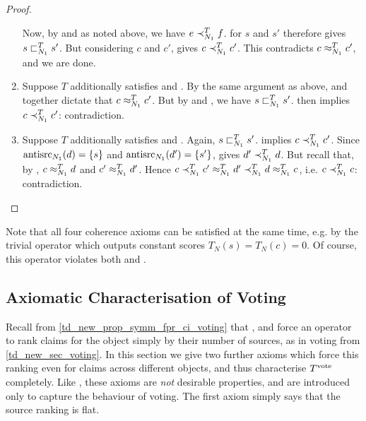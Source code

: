 \begin{proof}
\begin{enumerate}
              Now, by \freshposresp{} and \symmetry{} as noted above, we have
              $e \prec_{N_1}^T f$. \sourcecoherence{} for $s$ and $s'$ therefore
              gives $s \sqsubset_{N_1}^T s'$. But considering $c$ and $c'$,
              \claimcoherence{} gives $c \prec_{N_1}^T c'$. This contradicts $c
              \approx_{N_1}^T c'$, and we are done.

        \item Suppose $T$ additionally satisfies \sourceposresp{} and
              \conflictcoherence{}. By the same argument as above,
              \conflictcoherence{} and \symmetry{} together dictate that $c
              \approx_{N_1}^T c'$. But by \symmetry{} and \sourceposresp{}, we
              have $s \sqsubset_{N_1}^T s'$. \claimcoherence{} then implies $c
              \prec_{N_1}^T c'$: contradiction.

        \item Suppose $T$ additionally satisfies \sourceposresp{} and
              \anticoherence{}. Again, $s \sqsubset_{N_1}^T s'$. \claimcoherence{}
              implies $c \prec_{N_1}^T c'$. Since $\operatorname{antisrc}_{N_1}(d) = \{s\}$
              and $\operatorname{antisrc}_{N_1}(d') = \{s'\}$, \anticoherence{} gives $d'
              \prec_{N_1}^T d$. But recall that, by \symmetry{}, $c \approx_{N_1}^T
              d$ and $c' \approx_{N_1}^T d'$. Hence $c \prec_{N_1}^T c'
              \approx_{N_1}^T d' \prec_{N_1}^T d \approx_{N_1}^T c$, i.e. $c
              \prec_{N_1}^T c$: contradiction.
    \end{enumerate}
\end{proof}

Note that all four coherence axioms can be satisfied at the same time, e.g. by
the trivial operator which outputs constant scores $T_N(s) = T_N(c) = 0$. Of
course, this operator violates both \freshposresp{} and \sourceposresp{}.

\subsection{Axiomatic Characterisation of Voting}
\label{td_new_sec_a_characterisation_of_voting}

Recall from \cref{td_new_prop_symm_fpr_ci_voting} that \symmetry{},
\freshposresp{} and \classicalindependence{} force an operator to rank claims
for the object simply by their number of sources, as in voting from
\cref{td_new_sec_voting}. In this section we give two further axioms which
force this ranking even for claims across different objects, and thus
characterise $T^{\operatorname{vote}}{}$ completely. Like \classicalindependence{}, these
axioms are \emph{not} desirable properties, and are introduced only to capture
the behaviour of voting. The first axiom simply says that the source ranking is
flat.

